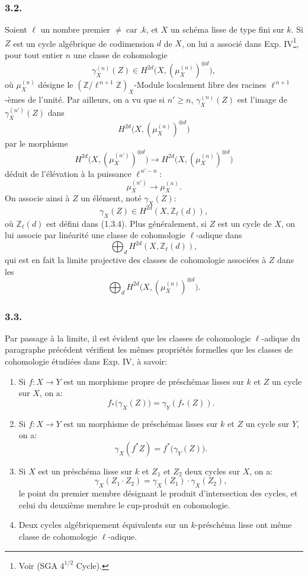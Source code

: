 \documentclass[11pt]{article}
\newcommand{\car}{\operatorname{car}}
\providecommand{\car}{\operatorname{car}}
\providecommand{\car}{\operatorname{car}}
\providecommand{\car}{\operatorname{car}}
\begin{document}
\subsubsection*{3.2.}
Soient \(\ell\) un nombre premier \(\ne\car.k\), et \(X\) un schéma lisse de type fini sur \(k\). Si \(Z\) est un cycle algébrique de codimension \(d\) de \(X\), on lui a associé dans Exp. IV\footnote{Voir (SGA \(4^{1/2}\) Cycle).}, pour tout entier \(n\) une classe de cohomologie
\[
\gamma_X^{(n)}(Z)\in H^{2d}\bigl(X,(\mu_X^{(n)})^{\otimes d}\bigr),
\]
où \(\mu_X^{(n)}\) désigne le \((\mathbb Z/\ell^{\,n+1}\mathbb Z)_X\)-Module localement libre des racines \(\ell^{\,n+1}\)-èmes de l'unité. Par ailleurs, on a vu que si \(n'\ge n\), \(\gamma_X^{(n)}(Z)\) est l'image de \(\gamma_X^{(n')}(Z)\) dans
\[
H^{2d}\bigl(X,(\mu_X^{(n)})^{\otimes d}\bigr)
\]
par le morphisme
\[
H^{2d}\bigl(X,(\mu_X^{(n')})^{\otimes d}\bigr)
\longrightarrow
H^{2d}\bigl(X,(\mu_X^{(n)})^{\otimes d}\bigr)
\]
déduit de l'élévation à la puissance \(\ell^{\,n'-n}\):
\[
\mu_X^{(n')}\longrightarrow \mu_X^{(n)}.
\]
On associe ainsi à \(Z\) un élément, noté \(\gamma_X(Z)\):
\[
\gamma_X(Z)\in H^{2d}(X,\mathbb Z_\ell(d)),
\]
où \(\mathbb Z_\ell(d)\) est défini dans (1.3.4). Plus généralement, si \(Z\) est un cycle de \(X\), on lui associe par linéarité une classe de cohomologie \(\ell\)-adique dans
\[
\bigoplus_d H^{2d}(X,\mathbb Z_\ell(d)),
\]
qui est en fait la limite projective des classes de cohomologie associées à \(Z\) dans les
\[
\bigoplus_d H^{2d}\bigl(X,(\mu_X^{(n)})^{\otimes d}\bigr).
\]

\subsubsection*{3.3.}
Par passage à la limite, il est évident que les classes de cohomologie \(\ell\)-adique du paragraphe précédent vérifient les mêmes propriétés formelles que les classes de cohomologie étudiées dans Exp. IV, à savoir:

\begin{enumerate}[label=(\roman*)]
\item Si \(f:X\to Y\) est un morphisme propre de préschémas lisses sur \(k\) et \(Z\) un cycle sur \(X\), on a:
\[
f_*\bigl(\gamma_X(Z)\bigr)=\gamma_Y(f_*(Z)).
\tag{*}
\]

\item Si \(f:X\to Y\) est un
morphisme de préschémas lisses sur \(k\) et \(Z\) un cycle sur \(Y\), on a:
\[
\gamma_X(f^*Z)=f^*\bigl(\gamma_Y(Z)\bigr).
\tag{**}
\]

\item Si \(X\) est un préschéma lisse sur \(k\) et \(Z_1\) et \(Z_2\) deux cycles sur \(X\), on a:
\[
\gamma_X(Z_1\cdot Z_2)=\gamma_X(Z_1)\cdot \gamma_X(Z_2),
\tag{**}
\]
le point du premier membre désignant le produit d'intersection des cycles, et celui du deuxième membre le cup-produit en cohomologie.

\item Deux cycles algébriquement équivalents sur un \(k\)-préschéma lisse ont même classe de cohomologie \(\ell\)-adique.
\end{enumerate}
\end{document}
